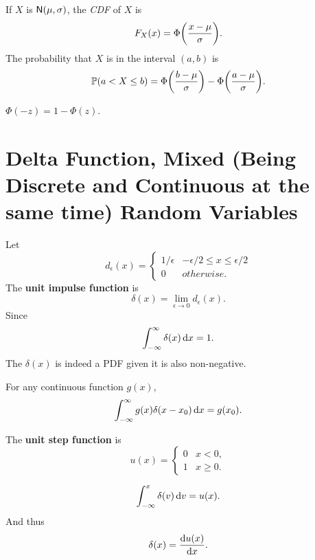 \begin{theorem}
    If $X$ is $\mathsf{N}(\mu,\sigma)$, the \emph{CDF} of $X$ is
    \[F_X(x)=\Phi\parens*{\frac{x-\mu}{\sigma}}.\]
    The probability that $X$ is in the interval \emph{$(a,b)$} is
    \[\P{a<X\leq b}=\Phi\parens*{\frac{b-\mu}{\sigma}}-\Phi\parens*{\frac{a-\mu}{\sigma}}.\]
\end{theorem}

\begin{theorem}
    $\Phi(-z)=1-\Phi(z)$.
\end{theorem}


\section{Delta Function, Mixed (Being Discrete and Continuous at the same time) Random Variables
}
\begin{definition}
    Let
    \[d_{\epsilon}(x)={
        \begin{cases}
            1/\epsilon & -\epsilon/2\leq x\leq \epsilon/2 \\
            0 & otherwise.
        \end{cases}
    }\]
    The \textbf{unit impulse function} is
    \[\delta(x)=\lim_{\epsilon\rightarrow 0}d_{\epsilon}(x).\]
    Since
    \[\int_{-\infty}^{\infty}\delta(x)\mathop{}\!\mathrm{d} x = 1.\]
    The $\delta(x)$ is indeed a PDF given it is also non-negative.
\end{definition}

\begin{theorem}
    For any continuous function $g(x)$,
    \[\int_{-\infty}^{\infty}g(x)\delta(x-x_0)\mathop{}\!\mathrm{d} x = g(x_0).\]
\end{theorem}

\begin{definition}
    The \textbf{unit step function} is
    \[u(x)={
        \begin{cases}
            0 & x<0, \\
            1 & x\geq 0.
        \end{cases}
    }\]
\end{definition}

\begin{theorem}\label{delta}
    \[\int_{-\infty}^{x}\delta(v)\mathop{}\!\mathrm{d} v = u(x).\]
    And thus
    \[\delta(x)=\frac{\mathop{}\!\mathrm{d} u(x)}{\mathop{}\!\mathrm{d} x}.\]
\end{theorem}

